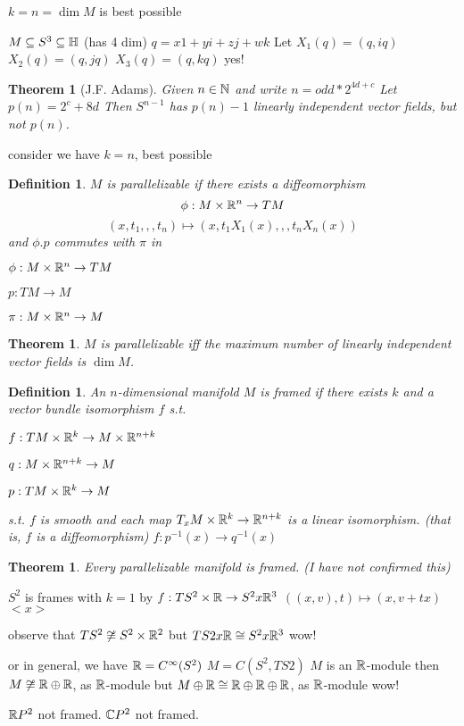 \documentclass[11pt,leqno,oneside]{amsart}
\newcommand{\x}{\times}
\theoremstyle{mystyle} \newtheorem{thrm}[thm]{Theorem}
\theoremstyle{mystyle} \newtheorem{defi}[thm]{Definition}
\begin{document}
$k = n = \dim M$ is best possible

\begin{example}
	$M \subseteq S^3 \subseteq {\mathbb H}$ (has 4 dim)
	$q = x1 + yi + zj + wk$
	Let
	$X_1(q) = (q, iq)$
	$X_2(q) = (q, jq)$
	$X_3(q) = (q, kq)$
	yes!
\end{example}
\begin{thrm}[J.F. Adams]
	Given $n \in {\mathbb N}$ and write $n = odd*2^{4d+c}$
	Let $p(n) = 2^c + 8d$
	Then $S^{n-1}$ has $p(n)-1$ linearly independent vector fields, but not $p(n)$.
\end{thrm}

consider we have $k = n$, best possible


\begin{defi}
	$M$ is \emph{parallelizable} if there exists a diffeomorphism
	$$\phi : M \x \R^n \to TM$$
	$$(x, t_1,,,t_n) \mapsto (x, t_1X_1(x),,,t_nX_n(x))$$
	and $\phi.p$ commutes with $\pi$ in

	$\phi : M \x \R^n \to TM$

	$p: TM \to M$

	$\pi: M \x \R^n \to M$

\end{defi}
\begin{thrm}
	$M$ is \emph{parallelizable} iff the maximum number of linearly independent vector fields is $\dim M$.
\end{thrm}
\begin{defi}
	An $n$-dimensional manifold $M$ is \emph{framed} if there exists $k$ and a vector bundle isomorphism $f$ s.t.

	$f : TM \x \R^k \to M \x \R^{n+k}$

	$q: M \x \R^{n+k} \to M$

	$p: TM \x \R^k \to M$

	s.t. $f$ is smooth and each map $T_xM \x \R^k \to \R^{n+k}$ is a linear isomorphism. (that is, $f$ is a diffeomorphism)
	$f: p^{-1}(x) \to q^{-1}(x)$
\end{defi}
\begin{thrm}
	Every parallelizable manifold is framed. (I have not confirmed this)
\end{thrm}
\begin{example}
	$S^2$ is frames with $k=1$ by
	$f : TS^2 \x \R \to S^2 x \R^3$
	$((x,v), t) \mapsto (x, v + tx)$
	$<x>$

	observe that
	$TS^2 \not\isom S^2 \x \R^2$
	but
	$TS2 x {\mathbb R} \mathrel{\cong} S^2 x {\mathbb R}^3$
	wow!

	or in general, we have
	${\mathbb R} = C^\infty(S^2)$
	$M = C(S^2, TS2)$
	$M$ is an ${\mathbb R}$-module
	then
	$M \not\mathrel{\cong} {\mathbb R} \oplus {\mathbb R}$, as ${\mathbb R}$-module
	but
	$M \oplus {\mathbb R} \mathrel{\cong} {\mathbb R} \oplus {\mathbb R} \oplus {\mathbb R}$, as ${\mathbb R}$-module
	wow!
\end{example}
\begin{example}
	${\mathbb R} P^2$ not framed.
	${\mathbb C} P^2$ not framed.
\end{example}
\end{document}
